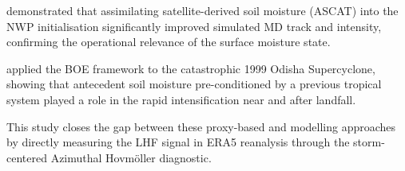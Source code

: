 \citet{osuri2020} demonstrated that assimilating satellite-derived
soil moisture (ASCAT) into the NWP initialisation significantly
improved simulated MD track and intensity, confirming the operational
relevance of the surface moisture state.

\citet{vijay2024boe} applied the BOE framework to the catastrophic
1999 Odisha Supercyclone, showing that antecedent soil moisture
pre-conditioned by a previous tropical system played a role in the
rapid intensification near and after landfall.

This study closes the gap between these proxy-based and modelling
approaches by directly measuring the LHF signal in ERA5 reanalysis
through the storm-centered Azimuthal Hovm\"{o}ller diagnostic.

%
%
%
